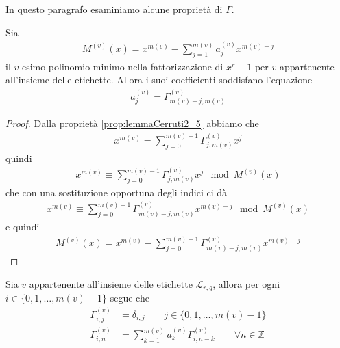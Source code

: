 In questo paragrafo esaminiamo alcune proprietà di $\Gamma$.
\begin{lemmax}
  Sia
  \begin{align*}
      M^{(v)}(x) = x^{m(v)} - \sum_{j=1}^{m(v)} a_{j}^{(v)} x^{m(v) - j}
  \end{align*}
  il $v$-esimo polinomio minimo nella fattorizzazione di $x^r - 1$ per $v$ appartenente all'insieme delle etichette. Allora i suoi coefficienti soddisfano l'equazione
  \begin{align*}
     a_{j}^{(v)} = \Gamma_{m(v) - j, m(v)}^{(v)}
  \end{align*}
\end{lemmax}
\begin{proof}
   Dalla proprietà \ref{prop:lemmaCerruti2_5} abbiamo che 
   \begin{align*}
      x^{m(v)}  = \sum_{j = 0}^{ m(v) - 1} \Gamma_{j,m(v)}^{(v)}x^{j}
   \end{align*}
   quindi 
   \begin{align*}
      x^{m(v)}  \equiv \sum_{j = 0}^{ m(v) - 1} \Gamma_{j,m(v)}^{(v)}x^{j} \mod{M^{(v)}(x)}
   \end{align*}
   che con una sostituzione opportuna degli indici ci dà
   \begin{align*}
      x^{m(v)}  \equiv \sum_{j = 0}^{ m(v) - 1} \Gamma_{m(v) - j,m(v)}^{(v)}x^{m(v) - j} \mod{M^{(v)}(x)}
   \end{align*}  
   e quindi 
   \begin{align*}
      M^{(v)}(x) = x^{m(v)} - \sum_{j = 0}^{ m(v) - 1} \Gamma_{m(v) - j,m(v)}^{(v)}x^{m(v) - j}
   \end{align*}

\end{proof}
\begin{teorema} \label{teo:winogradRicorrenza}
   Sia $v$ appartenente all'insieme delle etichette $\mathscr{L}_{r,q}$, allora per ogni $i \in \lbrace  0,1, \dots, m(v) - 1 \rbrace$ segue che
   \begin{align} \label{eq:winogradRicorrenza}
      \Gamma_{i,j}^{(v)} &= \delta_{i,j}  \qquad j \in \lbrace  0,1, \dots, m(v) - 1 \rbrace \\
      \Gamma_{i,n}^{(v)} &= \sum_{k=1}^{m(v)} a_{k}^{(v)} \Gamma_{i,n-k}^{(v)} \qquad \forall n \in \mathbb{Z}
   \end{align}
\end{teorema}
